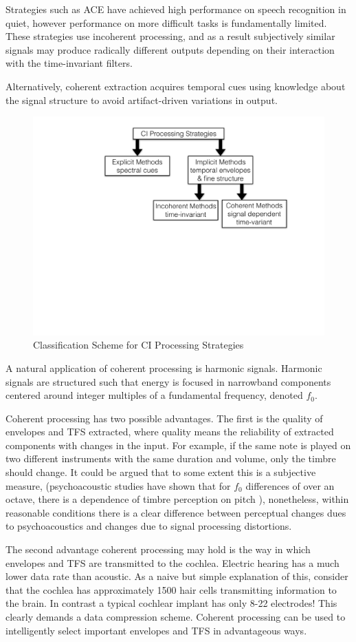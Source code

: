 \documentclass [11pt, proquest,oneside] {ganter_thesis}[2015/03/03]
\begin{document}
Strategies such as ACE have achieved high performance on speech recognition in quiet, however performance on more difficult tasks is fundamentally limited.  These strategies use incoherent processing, and as a result subjectively similar signals may produce radically different outputs depending on their interaction with the time-invariant filters.

Alternatively, coherent extraction acquires temporal cues using knowledge about the signal structure to avoid artifact-driven variations in output.

\begin{figure}[!ht]
  \centering
    \includegraphics[width=.6\textwidth]{explicitVimplicit}   
    \caption{Classification Scheme for CI Processing Strategies}\label{fig:explicitVimplicit}
\end{figure}

A natural application of coherent processing is harmonic signals.  Harmonic signals are structured such that energy is focused in narrowband components centered around integer multiples of a fundamental frequency, denoted $f_0$.

Coherent processing has two possible advantages.  The first is the quality of envelopes and TFS extracted, where quality means the reliability of extracted components with changes in the input.  For example, if the same note is played on two different instruments with the same duration and volume, only the timbre should change.  It could be argued that to some extent this is a subjective measure, (psychoacoustic studies have shown that for $f_0$ differences of over an octave, there is a dependence of timbre perception on pitch \cite{marozeau2003dependency}), nonetheless, within reasonable conditions there is a clear difference between perceptual changes dues to psychoacoustics and changes due to signal processing distortions.

The second advantage coherent processing may hold is the way in which envelopes and TFS are transmitted to the cochlea.  Electric hearing has a much lower data rate than acoustic.  As a naive but simple explanation of this, consider that the cochlea has approximately 1500 hair cells transmitting information to the brain.  In contrast a typical cochlear implant has only 8-22 electrodes!  This clearly demands a data compression scheme.  Coherent processing can be used to intelligently select important envelopes and TFS in advantageous ways.
\end{document}
